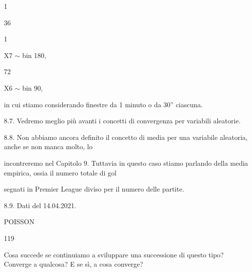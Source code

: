 \documentclass[a4paper,portrait,12pt]{article}
\begin{document}
1


36


1


\begin{flushleft}
X7 $\sim$ bin 180,
\end{flushleft}


72


\begin{flushleft}
X6 $\sim$ bin 90,
\end{flushleft}





\begin{flushleft}
in cui stiamo considerando finestre da 1 minuto o da 30'' ciascuna.
\end{flushleft}


\begin{flushleft}
8.7. Vedremo meglio più avanti i concetti di convergenza per variabili aleatorie.
\end{flushleft}


\begin{flushleft}
8.8. Non abbiamo ancora definito il concetto di media per una variabile aleatoria, anche se non manca molto, lo
\end{flushleft}


\begin{flushleft}
incontreremo nel Capitolo 9. Tuttavia in questo caso stiamo parlando della media empirica, ossia il numero totale di gol
\end{flushleft}


\begin{flushleft}
segnati in Premier League diviso per il numero delle partite.
\end{flushleft}


\begin{flushleft}
8.9. Dati del 14.04.2021.
\end{flushleft}





\begin{flushleft}
 POISSON
\end{flushleft}





119





\begin{flushleft}
Cosa succede se continuiamo a sviluppare una successione di questo tipo? Converge a qualcosa? E se sì, a cosa converge?
\end{flushleft}
\end{document}
